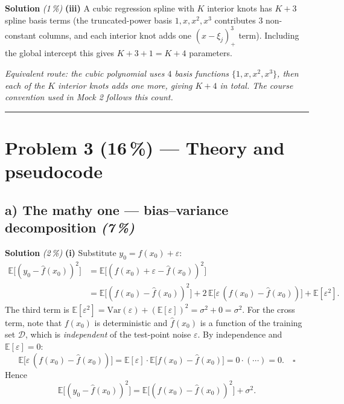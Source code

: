 \documentclass[11pt,a4paper]{article}
\newcommand{\points}[1]{\textbf{(#1\,\%)}}
\newcommand{\subpoints}[1]{\textit{(#1\,\%)}}
\newcommand{\sol}{\noindent\textbf{Solution}}
\begin{document}
\medskip
\sol{} \subpoints{1} \textbf{(iii)} A cubic regression spline with $K$ interior knots has $K+3$
spline basis terms (the truncated-power basis $1, x, x^2, x^3$ contributes $3$ non-constant
columns, and each interior knot adds one $(x-\xi_j)_+^3$ term). Including the global intercept
this gives $K + 3 + 1 = \boxed{K+4}$ parameters.

\emph{Equivalent route: the cubic polynomial uses $4$ basis functions $\{1, x, x^2, x^3\}$, then
each of the $K$ interior knots adds one more, giving $K+4$ in total. The course convention used
in Mock 2 follows this count.}

\vspace{0.6em}
\hrule
\vspace{1em}

\section*{Problem 3 \points{16} --- Theory and pseudocode}

\subsection*{a) The mathy one --- bias--variance decomposition \subpoints{7}}

\sol{} \subpoints{2} \textbf{(i)} Substitute $y_0 = f(x_0) + \varepsilon$:
\begin{align*}
\mathbb{E}\bigl[(y_0 - \hat f(x_0))^2\bigr]
   &= \mathbb{E}\bigl[(f(x_0) + \varepsilon - \hat f(x_0))^2\bigr] \\
   &= \mathbb{E}\bigl[(f(x_0) - \hat f(x_0))^2\bigr]
       + 2\,\mathbb{E}\bigl[\varepsilon\,(f(x_0) - \hat f(x_0))\bigr]
       + \mathbb{E}[\varepsilon^2].
\end{align*}
The third term is $\mathbb{E}[\varepsilon^2] = \mathrm{Var}(\varepsilon) + (\mathbb{E}[\varepsilon])^2 = \sigma^2 + 0 = \sigma^2$.
For the cross term, note that $f(x_0)$ is deterministic and $\hat f(x_0)$ is a function of the
training set $\mathcal D$, which is \emph{independent} of the test-point noise $\varepsilon$. By
independence and $\mathbb{E}[\varepsilon] = 0$:
$$\mathbb{E}\bigl[\varepsilon\,(f(x_0) - \hat f(x_0))\bigr]
   = \mathbb{E}[\varepsilon]\cdot \mathbb{E}\bigl[f(x_0) - \hat f(x_0)\bigr]
   = 0\cdot (\cdots) = 0. \quad\square$$
Hence
$$\mathbb{E}\bigl[(y_0 - \hat f(x_0))^2\bigr] = \mathbb{E}\bigl[(f(x_0) - \hat f(x_0))^2\bigr] + \sigma^2.$$
\end{document}
